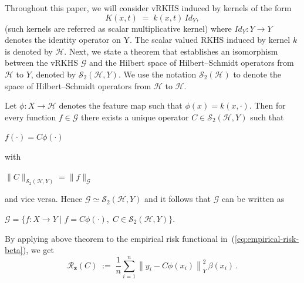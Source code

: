 \documentclass[twoside,11pt]{article}
\begin{document}
\noindent
Throughout this paper, we will  consider vRKHS induced by kernels of the form
\begin{equation}\label{multk}
K(x,t) \;=\; k(x,t)\, Id_Y,    
\end{equation}
(such kernels are referred as scalar multiplicative kernel) where $Id_Y : Y \to Y$ denotes the identity operator on Y.  
The scalar valued RKHS induced by kernel $k$ is denoted by $\mathcal{H}$. Next, we state a theorem that establishes an isomorphism between the vRKHS $\mathcal{G}$ and the Hilbert space of Hilbert--Schmidt operators from $\mathcal{H}$ to $Y$, denoted by $\mathcal{S}_2(\mathcal{H},Y)$. We use the notation $\mathcal{S}_2(\mathcal{H})$ to denote the space of Hilbert--Schmidt operators from $\mathcal{H}$ to $\mathcal{H}$.





\begin{theorem} Let $\phi:X\rightarrow \mathcal{H}$ denotes the feature map such that $\phi(x) = k(x,\cdot)$. Then for every function $f \in \mathcal{G}$ there exists a unique operator 
$C \in \mathcal S_2(\mathcal{H}, {Y})$ such that 

\begin{center}
    $f(\cdot) = C \phi(\cdot) $
\end{center}

\noindent
with 

\begin{center}
    $\|C\|_{\mathcal S_2(\mathcal{H}, {Y})} = \|f\|_{\mathcal{G}}$
\end{center}

\noindent
and vice versa. Hence $\mathcal{G} \simeq \mathcal S_2(\mathcal{H}, {Y})$ and
it follows that $\mathcal{G}$ can be written as

\begin{center}
    $\mathcal{G} = \{ f : {X} \to {Y} \mid 
    f = C \phi(\cdot), \; C \in \mathcal S_2(\mathcal{H}, {Y}) \}.$
\end{center}
\end{theorem}

\noindent
By applying above theorem to the empirical risk functional 
in~(\ref{eq:empirical-risk-beta}), we get 
\begin{equation}\label{equation:emphiirical_Riskin C}
\mathcal{R}_\mathbf{z}(C) 
    \;:=\; \frac{1}{n}\sum_{i=1}^n 
    \left\| y_i - C \phi(x_i) \right\|_{{Y}}^2 \, \beta(x_i) \, .
\end{equation}    
\end{document}
